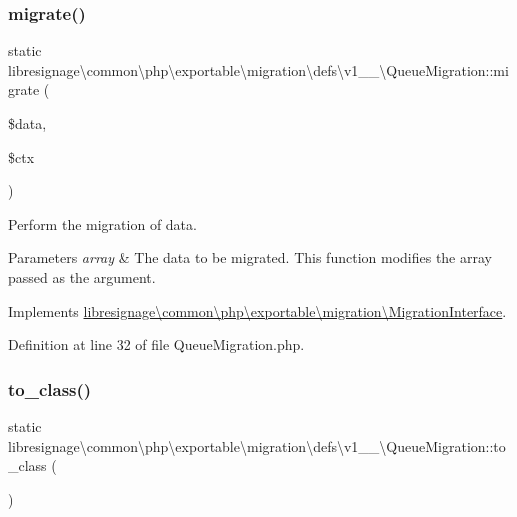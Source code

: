 \subsubsection{\texorpdfstring{migrate()}{migrate()}}
{\footnotesize\ttfamily static libresignage\textbackslash{}common\textbackslash{}php\textbackslash{}exportable\textbackslash{}migration\textbackslash{}defs\textbackslash{}v1\+\_\+\_\textbackslash{}\+Queue\+Migration\+::migrate (\begin{DoxyParamCaption}\item[{array \&}]{\$data,  }\item[{\hyperlink{classlibresignage_1_1common_1_1php_1_1exportable_1_1ExportableDataContext}{Exportable\+Data\+Context}}]{\$ctx }\end{DoxyParamCaption})\hspace{0.3cm}{\ttfamily [static]}}

Perform the migration of data.


\begin{DoxyParams}{Parameters}
{\em array} & The data to be migrated. This function modifies the array passed as the argument. \\
\hline
\end{DoxyParams}


Implements \hyperlink{interfacelibresignage_1_1common_1_1php_1_1exportable_1_1migration_1_1MigrationInterface_a8275bfe14f59f19bb3b33b239fd48c5d}{libresignage\textbackslash{}common\textbackslash{}php\textbackslash{}exportable\textbackslash{}migration\textbackslash{}\+Migration\+Interface}.



Definition at line 32 of file Queue\+Migration.\+php.

\mbox{\label{classlibresignage_1_1common_1_1php_1_1exportable_1_1migration_1_1defs_1_1v1__1__0_1_1QueueMigration_a54a401888991918a47966cc788bd034a}} 
\subsubsection{\texorpdfstring{to\+\_\+class()}{to\_class()}}
{\footnotesize\ttfamily static libresignage\textbackslash{}common\textbackslash{}php\textbackslash{}exportable\textbackslash{}migration\textbackslash{}defs\textbackslash{}v1\+\_\+\_\textbackslash{}\+Queue\+Migration\+::to\+\_\+class (\begin{DoxyParamCaption}{ }\end{DoxyParamCaption})\hspace{0.3cm}{\ttfamily [static]}}

